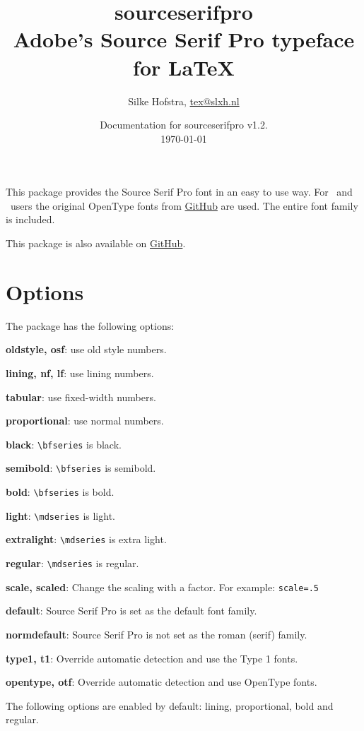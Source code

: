 \documentclass[10pt,a4paper,english]{article}
\title{\bfseries
	\Huge sourceserifpro\\
	\Large Adobe's Source Serif Pro typeface for \LaTeX
}
\author{Silke Hofstra, \href{mailto:tex@slxh.nl}{tex@slxh.nl}}
\date{Documentation for sourceserifpro v1.2.\\ \today}
\begin{document}
\maketitle
\begin{multicols}{2}
This package provides the Source Serif Pro font in an easy to use way. For \XeLaTeX\ and \LuaLaTeX\ users the original OpenType fonts from \href{https://github.com/adobe-fonts/source-serif-pro}{GitHub} are used. The entire font family is included.

This package is also available on \href{https://github.com/silkeh/latex-sourceserifpro}{GitHub}.

\section{Options}
The package has the following options:
\begin{itemize*}
	\item \textbf{oldstyle, osf}:  use old style numbers.
	\item \textbf{lining, nf, lf}: use lining numbers.
	\item \textbf{tabular}:        use fixed-width numbers.
	\item \textbf{proportional}:   use normal numbers.
	\item \textbf{black}:          \texttt{\textbackslash bfseries} is black.
	\item \textbf{semibold}:       \texttt{\textbackslash bfseries} is semibold.
	\item \textbf{bold}:           \texttt{\textbackslash bfseries} is bold.
	\item \textbf{light}:          \texttt{\textbackslash mdseries} is light.
	\item \textbf{extralight}:     \texttt{\textbackslash mdseries} is extra light.
	\item \textbf{regular}:        \texttt{\textbackslash mdseries} is regular.
	\item \textbf{scale, scaled}:  Change the scaling with a factor. For example:  \texttt{scale=.5}
	\item \textbf{default}:        Source Serif Pro is set as the default font family.
	\item \textbf{normdefault}:    Source Serif Pro is not set as the roman (serif) family.
	\item \textbf{type1, t1}:      Override automatic detection and use the Type 1 fonts.
	\item \textbf{opentype, otf}:  Override automatic detection and use OpenType fonts.
\end{itemize*}
The following options are enabled by default: lining, proportional, bold and regular.


\end{multicols}
\end{document}
